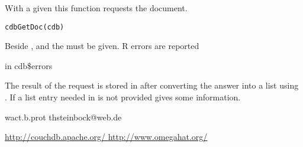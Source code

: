 \begin{Description}\relax
With a given  this function requests the document.
\end{Description}
\begin{Usage}
\begin{verbatim}
cdbGetDoc(cdb)
\end{verbatim}
\end{Usage}
\begin{Arguments}
\begin{ldescription}
\item[\code{cdb}] Beside ,  and
 the  must be given. R errors are
reported

in cdb\$errors

\end{ldescription}
\end{Arguments}
\begin{Value}
\begin{ldescription}
\item[\code{cdb }] The result of the request is stored in  after
converting the answer into a list using . If a list
entry  needed in  is not provided 
gives some information.


\end{ldescription}
\end{Value}
\begin{Author}\relax
wact.b.prot
thsteinbock@web.de
\end{Author}
\begin{References}\relax
\url{  http://couchdb.apache.org/            }
\url{  http://www.omegahat.org/  }
\end{References}
\begin{SeeAlso}\relax
{}
\end{SeeAlso}

